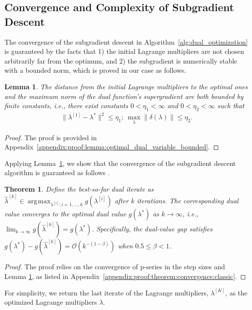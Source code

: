 \documentclass[journal]{IEEEtran}
\newtheorem{theorem}{Theorem}
\newtheorem{lemma}{Lemma}
\DeclareMathOperator*{\argmax}{\arg\!\max}
\begin{document}
\subsection{Convergence and Complexity of Subgradient Descent}\label{subsec:subgradient_convergence_and_complexity_analysis}
The convergence of the subgradient descent in Algorithm~\ref{alg:dual_optimization} is guaranteed by the facts that 1) the initial Lagrange multipliers are not chosen arbitrarily far from the optimum, and 2) the subgradient is numerically stable with a bounded norm, which is proved in our case as follows.
\begin{lemma}\label{lemma:optimal_dual_variable_bounded}
    The distance from the initial Lagrange multipliers to the optimal ones and the maximum norm of the dual function's supergradient are both bounded by finite constants, i.e., there exist constants $0<\eta_1<\infty$ and $0<\eta_2<\infty$ such that
    \begin{equation}
      \begin{aligned}
        \|\lambda^{[1]}-\lambda^*\|^2 \leq \eta_1; \ \max_\lambda \|\delta(\lambda)\| \leq \eta_2.
      \end{aligned}
    \end{equation} 
\end{lemma}
\begin{proof}
    The proof is provided in Appendix~\ref{appendix:proof:lemma:optimal_dual_variable_bounded}.
\end{proof}

Applying Lemma~\ref{lemma:optimal_dual_variable_bounded}, we show that the convergence of the subgradient descent algorithm is guaranteed as follows \cite{boyd2003subgradient}.
\begin{theorem}\label{theorem:convergence:classic}
Define the best-so-far dual iterate as $\hat{\lambda}^{[k]} \in \argmax_{\lambda^{[i]}:i=1,\dots,k} g(\lambda^{[i]})$ after $k$ iterations. The corresponding dual value converges to the optimal dual value $g(\lambda^*)$ as $k\to\infty$, i.e., $\lim_{k\to\infty} g(\hat{\lambda}^{[k]}) = g(\lambda^*)$. Specifically, the dual-value gap satisfies $g(\lambda^*) - g(\hat{\lambda}^{[k]}) = \mathcal{O}(k^{-(1-\beta)})$ when $0.5\leq\beta<1$.
\end{theorem}
\begin{proof}
    The proof relies on the convergence of p-series in the step sizes \cite{boyd2003subgradient} and Lemma \ref{lemma:optimal_dual_variable_bounded}, as listed in Appendix~\ref{appendix:proof:theorem:convergence:classic}.
\end{proof}
For simplicity, we return the last iterate of the Lagrange multipliers, $\lambda^{[K]}$, as the optimized Lagrange multipliers $\lambda$.
\end{document}

